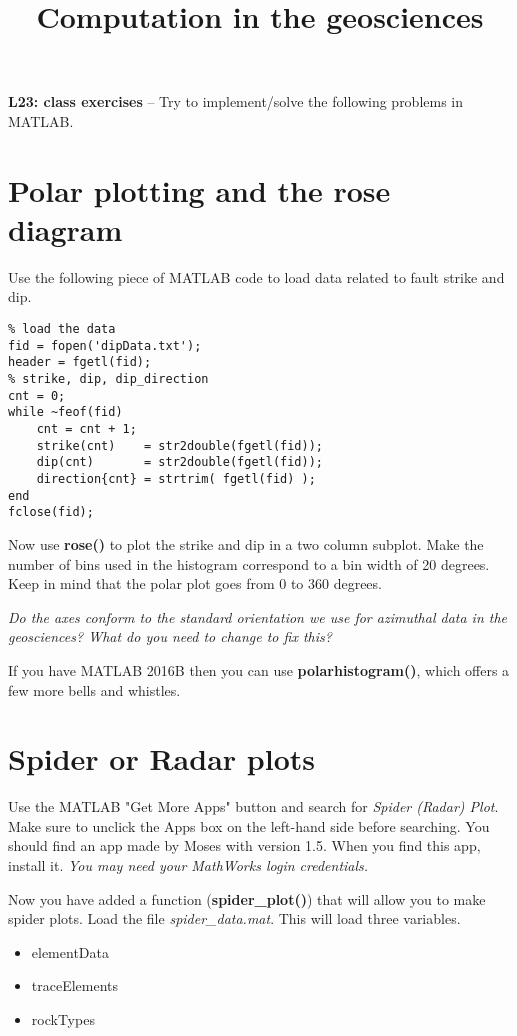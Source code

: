 \documentclass[10pt,fleqn]{article}
\title{Computation in the geosciences}
\date{\empty}
\begin{document}
\textbf{L23: class exercises} -- Try to implement/solve the following problems in MATLAB.

\section*{Polar plotting and the rose diagram}

Use the following piece of MATLAB code to load data related to fault strike and dip.

\begin{lstlisting}
% load the data
fid = fopen('dipData.txt');
header = fgetl(fid);
% strike, dip, dip_direction
cnt = 0;
while ~feof(fid)
    cnt = cnt + 1;
    strike(cnt)    = str2double(fgetl(fid));
    dip(cnt)       = str2double(fgetl(fid));
    direction{cnt} = strtrim( fgetl(fid) );
end
fclose(fid);
\end{lstlisting}

Now use \textbf{rose()} to plot the strike and dip in a two column subplot. Make the number of bins used in the histogram correspond to a bin width of 20 degrees. Keep in mind that the polar plot goes from 0 to 360 degrees.

\textit{Do the axes conform to the standard orientation we use for azimuthal data in the geosciences? What do you need to change to fix this?
}

If you have MATLAB 2016B then you can use \textbf{polarhistogram()}, which offers a few more bells and whistles.

\section*{Spider or Radar plots}

Use the MATLAB "Get More Apps" button and search for \textit{Spider (Radar) Plot}. Make sure to unclick the Apps box on the left-hand side before searching. You should find an app made by Moses with version 1.5. When you find this app, install it. \textit{You may need your MathWorks login credentials.}

Now you have added a function (\textbf{spider\_plot()}) that will allow you to make spider plots. Load the file \textit{spider\_data.mat}. This will load three variables.

\begin{itemize}
	\item elementData
	\item traceElements
	\item rockTypes
\end{itemize}
\end{document}

